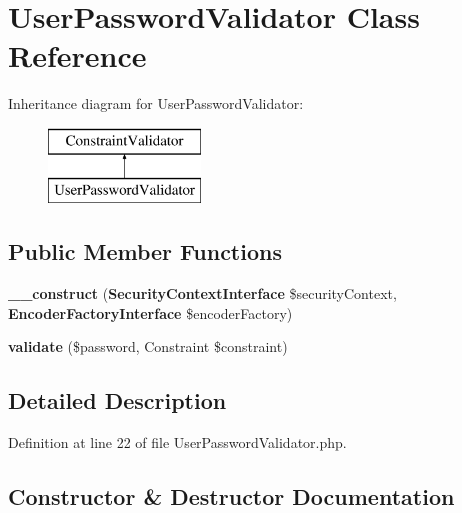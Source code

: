 \section{User\+Password\+Validator Class Reference}
\label{class_symfony_1_1_component_1_1_security_1_1_core_1_1_validator_1_1_constraints_1_1_user_password_validator}
Inheritance diagram for User\+Password\+Validator\+:\begin{figure}[H]
\begin{center}
\leavevmode
\includegraphics[height=2.000000cm]{class_symfony_1_1_component_1_1_security_1_1_core_1_1_validator_1_1_constraints_1_1_user_password_validator}
\end{center}
\end{figure}
\subsection*{Public Member Functions}
\begin{DoxyCompactItemize}
\item 
{\bf \+\_\+\+\_\+construct} ({\bf Security\+Context\+Interface} \$security\+Context, {\bf Encoder\+Factory\+Interface} \$encoder\+Factory)
\item 
{\bf validate} (\$password, Constraint \$constraint)
\end{DoxyCompactItemize}


\subsection{Detailed Description}


Definition at line 22 of file User\+Password\+Validator.\+php.



\subsection{Constructor \& Destructor Documentation}
